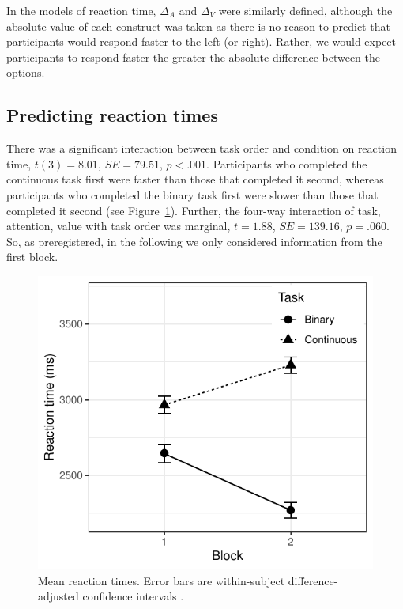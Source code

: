 \documentclass[12pt]{article}
\begin{document}
In the models of reaction time, $\Delta_A$ and $\Delta_V$ were similarly defined, although the absolute value of each construct was taken as there is no reason to predict that participants would respond faster to the left (or right). Rather, we would expect participants to respond faster the greater the absolute difference between the options. 

\subsection{Predicting reaction times}
There was a significant interaction between task order and condition on reaction time, $t(3)=8.01$, $SE=79.51$, $p<.001$. Participants who completed the continuous task first were faster than those that completed it second, whereas participants who completed the binary task first were slower than those that completed it second (see Figure~\ref{figure:RTblockGraph}). Further, the four-way interaction of task, attention, value with task order was marginal, $t=1.88$, $SE=139.16$, $p=.060$. So, as preregistered, in the following we only considered information from the first block. 

\begin{figure}
	\centering
	\includegraphics{images/RTorderEffects.pdf}
	\caption{Mean reaction times. Error bars are within-subject difference-adjusted confidence intervals \protect\cite{Baguley2012}.}
	\label{figure:RTblockGraph}
\end{figure}
\end{document}
